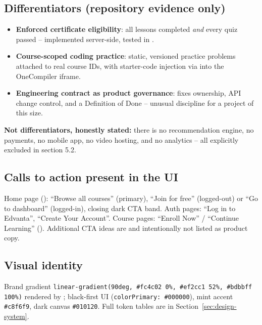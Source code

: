 \subsection{Differentiators (repository evidence only)}

\begin{itemize}
    \item \textbf{Enforced certificate eligibility}: all lessons completed \emph{and} every quiz passed -- implemented server-side, tested in .
    \item \textbf{Course-scoped coding practice}: static, versioned practice problems attached to real course IDs, with starter-code injection via  into the OneCompiler iframe.
    \item \textbf{Engineering contract as product governance}:  fixes ownership, API change control, and a Definition of Done -- unusual discipline for a project of this size.
\end{itemize}

\noindent \textbf{Not differentiators, honestly stated:} there is no recommendation engine, no payments, no mobile app, no video hosting, and no analytics -- all explicitly excluded in  section 5.2.

\subsection{Calls to action present in the UI}

Home page (): ``Browse all courses'' (primary), ``Join for free'' (logged-out) or ``Go to dashboard'' (logged-in), closing dark CTA band. Auth pages: ``Log in to Edvanta'', ``Create Your Account''. Course pages: ``Enroll Now'' / ``Continue Learning'' (). Additional CTA ideas are  and intentionally not listed as product copy.

\subsection{Visual identity}

Brand gradient \texttt{linear-gradient(90deg, \#fc4c02 0\%, \#ef2cc1 52\%, \#bdbbff 100\%)} rendered by ; black-first UI (\texttt{colorPrimary: \#000000}), mint accent \texttt{\#c8f6f9}, dark canvas \texttt{\#010120}. Full token tables are in Section~\ref{sec:design-system}.

